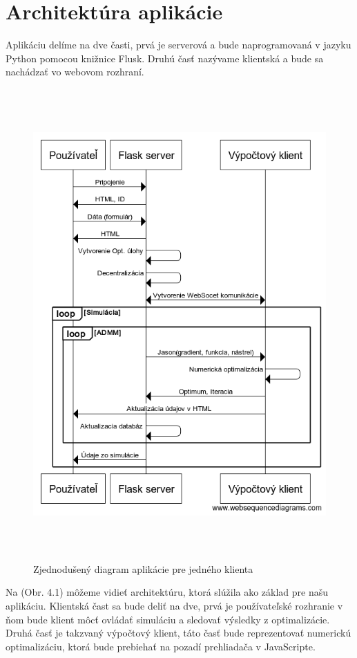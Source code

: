 \section{Architektúra aplikácie}
Aplikáciu delíme na dve časti, prvá je serverová a bude naprogramovaná v jazyku Python pomocou knižnice Flusk. Druhú časť nazývame klientská a bude sa nachádzať vo webovom rozhraní.
\label{fig:ArchitekturaAPK}
\begin{figure}[H]	
	\centering
	\includegraphics[width=13cm,height=18cm]{images/Aplikacia}
	\caption{Zjednodušený diagram aplikácie pre jedného klienta}
\end{figure}
\newpage
Na (Obr. 4.1) môžeme vidieť architektúru, ktorá slúžila ako základ pre našu aplikáciu. Klientská čast sa bude deliť na dve, prvá je používateľské rozhranie v ňom bude klient môcť ovládať simuláciu a sledovať výsledky z optimalizácie. Druhá časť je takzvaný výpočtový klient, táto časť bude reprezentovať numerickú optimalizáciu, ktorá bude prebiehať na pozadí prehliadača v JavaScripte. 

